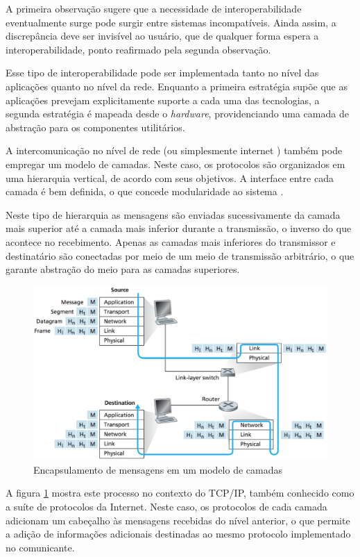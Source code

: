 A primeira observação sugere que a necessidade de interoperabilidade eventualmente
surge pode surgir entre sistemas incompatíveis. Ainda assim, a discrepância deve ser
invisível ao usuário, que de qualquer forma espera a interoperabilidade, ponto
reafirmado pela segunda observação.

Esse tipo de interoperabilidade pode ser implementada tanto no nível das aplicações
quanto no nível da rede. Enquanto a primeira estratégia supõe que as aplicações
prevejam explicitamente suporte a cada uma das tecnologias, a segunda estratégia
é mapeada desde o \textit{hardware}, providenciando uma camada de abstração para os
componentes utilitários.

A intercomunicação no nível de rede (ou simplesmente internet \cite{comer2000})
também pode empregar um modelo de camadas. Neste caso, os protocolos são organizados
em uma hierarquia vertical, de acordo com seus objetivos. A interface entre cada
camada é bem definida, o que concede modularidade ao sistema \cite{kurose2012}.

Neste tipo de hierarquia as mensagens são enviadas sucessivamente da camada mais
superior até a camada mais inferior durante a transmissão, o inverso do que acontece
no recebimento. Apenas as camadas mais inferiores do transmissor e destinatário são
conectadas por meio de um meio de transmissão arbitrário, o que garante abstração do
meio para as camadas superiores.

\begin{figure}[h]
	\centering
		\includegraphics[keepaspectratio=true,scale=0.6]{figuras/encapsulamento.eps}
	\caption{Encapsulamento de mensagens em um modelo de camadas \cite{kurose2012}}
	\label{fig:encapsulamento}
\end{figure}

A figura \ref{fig:encapsulamento} mostra este processo no contexto do TCP/IP, também
conhecido como a suíte de protocolos da Internet. Neste caso, os protocolos de cada
camada adicionam um cabeçalho às mensagens recebidas do nível anterior, o que
permite a adição de informações adicionais destinadas ao mesmo protocolo
implementado no comunicante.


